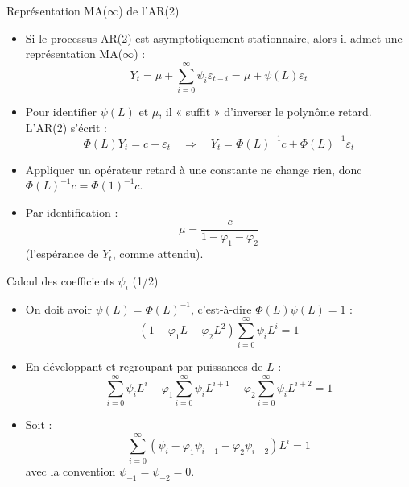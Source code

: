 \documentclass[11pt,aspectratio=169]{beamer}
\begin{document}
\begin{frame}{Représentation MA($\infty$) de l'AR(2)}

\begin{itemize}

\item Si le processus AR(2) est asymptotiquement stationnaire, alors il admet une représentation MA($\infty$) :
\[
Y_t = \mu + \sum_{i=0}^{\infty} \psi_i \varepsilon_{t-i} = \mu + \psi(L) \varepsilon_t
\]

\item Pour identifier $\psi(L)$ et $\mu$, il « suffit » d'inverser le polynôme retard. L'AR(2) s'écrit :
\[
\Phi(L) Y_t = c + \varepsilon_t \quad \Rightarrow \quad Y_t = \Phi(L)^{-1} c + \Phi(L)^{-1} \varepsilon_t
\]

\item Appliquer un opérateur retard à une constante ne change rien, donc $\Phi(L)^{-1} c = \Phi(1)^{-1} c$.\newline

\item Par identification :
\[
\mu = \frac{c}{1 - \varphi_1 - \varphi_2}
\]
(l'espérance de $Y_t$, comme attendu).

\end{itemize}
\end{frame}

\begin{frame}{Calcul des coefficients $\psi_i$ (1/2)}

\begin{itemize}

\item On doit avoir $\psi(L) = \Phi(L)^{-1}$, c'est-à-dire $\Phi(L) \psi(L) = 1$ :
\[
(1 - \varphi_1 L - \varphi_2 L^2) \sum_{i=0}^{\infty} \psi_i L^i = 1
\]

\item En développant et regroupant par puissances de $L$ :
\[
\sum_{i=0}^{\infty} \psi_i L^i - \varphi_1 \sum_{i=0}^{\infty} \psi_i L^{i+1} - \varphi_2 \sum_{i=0}^{\infty} \psi_i L^{i+2} = 1
\]

\item Soit :
\[
\sum_{i=0}^{\infty} (\psi_i - \varphi_1 \psi_{i-1} - \varphi_2 \psi_{i-2}) L^i = 1
\]
avec la convention $\psi_{-1} = \psi_{-2} = 0$.

\end{itemize}
\end{frame}
\end{document}
